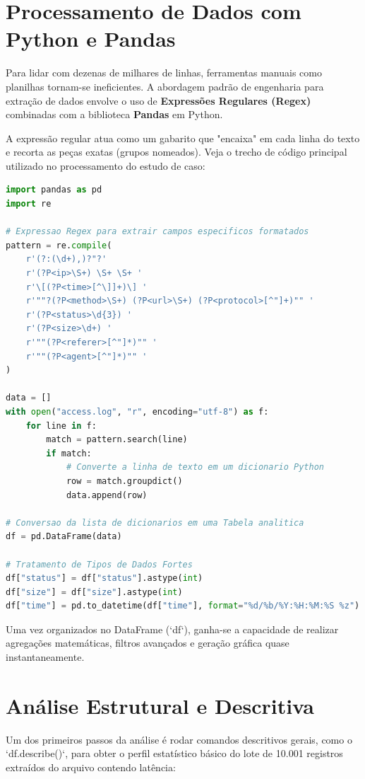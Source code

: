 \documentclass[12pt,a4paper,twoside]{report}
\begin{document}
\section{Processamento de Dados com Python e Pandas}

Para lidar com dezenas de milhares de linhas, ferramentas manuais como planilhas tornam-se ineficientes. A abordagem padrão de engenharia para extração de dados envolve o uso de \textbf{Expressões Regulares (Regex)} combinadas com a biblioteca \textbf{Pandas} \cite{mckinney2022} em Python.

A expressão regular atua como um gabarito que "encaixa" em cada linha do texto e recorta as peças exatas (grupos nomeados). Veja o trecho de código principal utilizado no processamento do estudo de caso:

\begin{lstlisting}[language=Python, caption={Extração de dados de log via Regex em Python}]
import pandas as pd
import re

# Expressao Regex para extrair campos especificos formatados
pattern = re.compile(
    r'(?:(\d+),)?"?'
    r'(?P<ip>\S+) \S+ \S+ '
    r'\[(?P<time>[^\]]+)\] '
    r'""?(?P<method>\S+) (?P<url>\S+) (?P<protocol>[^"]+)"" '
    r'(?P<status>\d{3}) '
    r'(?P<size>\d+) '
    r'""(?P<referer>[^"]*)"" '
    r'""(?P<agent>[^"]*)"" '
)

data = []
with open("access.log", "r", encoding="utf-8") as f:
    for line in f:
        match = pattern.search(line)
        if match:
            # Converte a linha de texto em um dicionario Python
            row = match.groupdict()
            data.append(row)

# Conversao da lista de dicionarios em uma Tabela analitica
df = pd.DataFrame(data)

# Tratamento de Tipos de Dados Fortes
df["status"] = df["status"].astype(int)
df["size"] = df["size"].astype(int)
df["time"] = pd.to_datetime(df["time"], format="%d/%b/%Y:%H:%M:%S %z")
\end{lstlisting}

Uma vez organizados no DataFrame (`df`), ganha-se a capacidade de realizar agregações matemáticas, filtros avançados e geração gráfica quase instantaneamente.

\section{Análise Estrutural e Descritiva}

Um dos primeiros passos da análise é rodar comandos descritivos gerais, como o `df.describe()`, para obter o perfil estatístico básico do lote de 10.001 registros extraídos do arquivo contendo latência:
\end{document}
